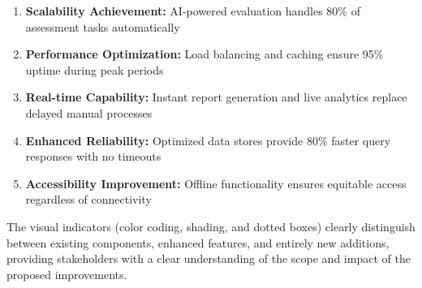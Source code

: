 \documentclass[12pt,a4paper,oneside]{book}
\begin{document}
\begin{enumerate}
    \item \textbf{Scalability Achievement:} AI-powered evaluation handles 80\% of assessment tasks automatically
    \item \textbf{Performance Optimization:} Load balancing and caching ensure 95\% uptime during peak periods
    \item \textbf{Real-time Capability:} Instant report generation and live analytics replace delayed manual processes
    \item \textbf{Enhanced Reliability:} Optimized data stores provide 80\% faster query responses with no timeouts
    \item \textbf{Accessibility Improvement:} Offline functionality ensures equitable access regardless of connectivity
\end{enumerate}

The visual indicators (color coding, shading, and dotted boxes) clearly distinguish between existing components, enhanced features, and entirely new additions, providing stakeholders with a clear understanding of the scope and impact of the proposed improvements.
\end{document}
